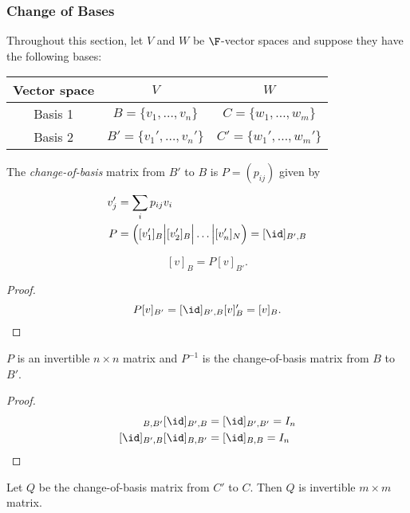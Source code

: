 \documentclass[a4paper]{article}
\theoremstyle{definition}
\begin{document}
\subsubsection{Change of Bases}

Throughout this section, let \(V\) and \(W\) be \(\F\)-vector spaces and suppose they have the following bases:
\begin{table}[htbp]
  \centering
  \begin{tabular}{|c||c|c|}
    \hline
    Vector space & \(V\) & \(W\) \\ \hline
    Basis 1 & \(B = \{v_1,\dots,v_n\}\) & \(C = \{w_1,\dots,w_m\}\) \\ \hline
    Basis 2 & \(B' = \{v_1',\dots,v_n'\}\) & \(C' = \{w_1',\dots,w_m'\}\) \\ \hline
  \end{tabular}
\end{table}

\begin{defi}
  The \emph{change-of-basis} matrix from \(B'\) to \(B\) is \(P = (p_{ij})\) given by
  \begin{align*}
    v_j' &= \sum_{i}^{ }p_{ij}v_i \\
    P &= \Big( [v_1']_B \Big| [v_2']_B \Big| \dots \Big| [v_n']_N \Big) = [\id]_{B',B}
  \end{align*}
\end{defi}

\begin{lem}
  \[
    [v]_B = P[v]_{B'}.
  \]
\end{lem}

\begin{proof}
  \[
    P[v]_{B'} = [\id]_{B',B}[v]_B' = [v]_B.
  \]
\end{proof}

\begin{lem}
  \(P\) is an invertible \(n\times n\) matrix and \(P^{-1}\) is the change-of-basis matrix from \(B\) to \(B'\).
\end{lem}

\begin{proof}
  \begin{align*}
    [\id]_{B,B'}[\id]_{B',B} &= [\id]_{B',B'} = I_n \\
    [\id]_{B',B}[\id]_{B,B'} &= [\id]_{B,B} = I_n
  \end{align*}
\end{proof}

Let \(Q\) be the change-of-basis matrix from \(C'\) to \(C\). Then \(Q\) is invertible \(m\times m\) matrix.
\end{document}
